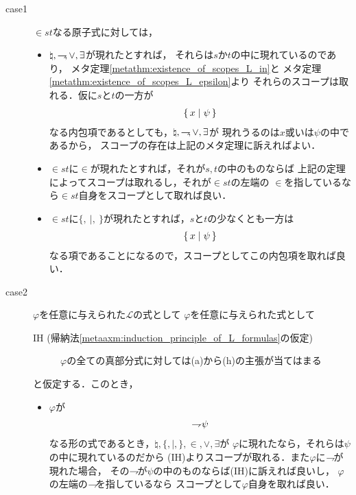 	\begin{metaprf}\mbox{}
		\begin{description}
			\item[case1] $\in st$なる原子式に対しては，
				\begin{itemize}
					\item $\natural,\rightharpoondown\hspace{-0.25em},\vee,\exists$が現れたとすれば，
						それらは$s$か$t$の中に現れているのであり，
						メタ定理\ref{metathm:existence_of_scopes_L_in}と
						メタ定理\ref{metathm:existence_of_scopes_L_epsilon}より
						それらのスコープは取れる．仮に$s$と$t$の一方が
						\begin{align}
							\{\, x \mid \psi\, \}
						\end{align}
						なる内包項であるとしても，$\natural,\rightharpoondown\hspace{-0.25em},\vee,\exists$が
						現れうるのは$x$或いは$\psi$の中であるから，
						スコープの存在は上記のメタ定理に訴えればよい．
				
					\item $\in st$に$\in$が現れたとすれば，それが$s,t$の中のものならば
						上記の定理によってスコープは取れるし，それが$\in st$の左端の
						$\in$を指しているなら$\in st$自身をスコープとして取れば良い．
						
					\item $\in st$に$\{,\ |,\ \}$が現れたとすれば，$s$と$t$の少なくとも一方は
						\begin{align}
							\{\, x \mid \psi\, \}
						\end{align}
						なる項であることになるので，スコープとしてこの内包項を取れば良い．
				\end{itemize}
				
			\item[case2] $\varphi$を任意に与えられた$\mathcal{L}$の式として
				$\varphi$を任意に与えられた式として
				\begin{description}
					\item[IH (帰納法\ref{metaaxm:induction_principle_of_L_formulas}の仮定)]
						$\varphi$の全ての真部分式に対しては(a)から(h)の主張が当てはまる
				\end{description}
				と仮定する．このとき，
				\begin{itemize}
					\item $\varphi$が
						\begin{align}
							\rightharpoondown\hspace{-0.25em} \psi
						\end{align}
						なる形の式であるとき，$\natural,\{,|,\},\in,\vee,\exists$が
						$\varphi$に現れたなら，それらは$\psi$の中に現れているのだから
						(IH)よりスコープが取れる．また$\varphi$に$\rightharpoondown\hspace{-0.25em}$が現れた場合，
						その$\rightharpoondown\hspace{-0.25em}$が$\psi$の中のものならば(IH)に訴えれば良いし，
						$\varphi$の左端の$\rightharpoondown\hspace{-0.25em}$を指しているなら
						スコープとして$\varphi$自身を取れば良い．
						

\end{itemize}
\end{description}
\end{metaprf}
